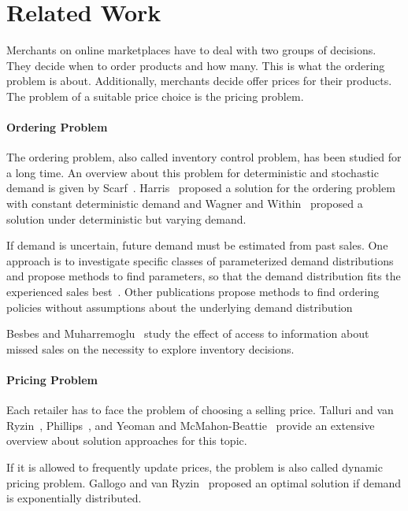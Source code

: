 
\chapter{Related Work}
\label{chapter:related_work}

Merchants on online marketplaces have to deal with two groups of decisions.
They decide when to order products and how many.
This is what the ordering problem is about.
Additionally, merchants decide offer prices for their products.
The problem of a suitable price choice is the pricing problem.

\subsubsection*{Ordering Problem}
The ordering problem, also called inventory control problem, has been studied for a long time.
An overview about this problem for deterministic and stochastic demand is given by Scarf~\cite{scarf1963survey}.
Harris~\cite{harris1913many} proposed a solution for the ordering problem with constant deterministic demand and Wagner and Within~\cite{wagner1958dynamic} proposed a solution under deterministic but varying demand.

If demand is uncertain, future demand must be estimated from past sales.
One approach is to investigate specific classes of parameterized demand distributions and propose methods to find parameters, so that the demand distribution fits the experienced sales best~\cite{azoury1985bayes}.
Other publications propose methods to find ordering policies without assumptions about the underlying demand distribution~\cite{DBLP:journals/mor/LeviRS07,huh2011adaptive,ban2017big}

Besbes and Muharremoglu~\cite{DBLP:journals/mansci/BesbesM13} study the effect of access to information about missed sales on the necessity to explore inventory decisions.

\subsubsection*{Pricing Problem}
Each retailer has to face the problem of choosing a selling price.
Talluri and van Ryzin~\cite{talluri2004theory}, Phillips~\cite{phillips2005pricing}, and Yeoman and McMahon-Beattie~\cite{yeoman2010revenue} provide an extensive overview about solution approaches for this topic.

If it is allowed to frequently update prices, the problem is also called dynamic pricing problem.
Gallogo and van Ryzin~\cite{gallego1994optimal} proposed an optimal solution if demand is exponentially distributed.


